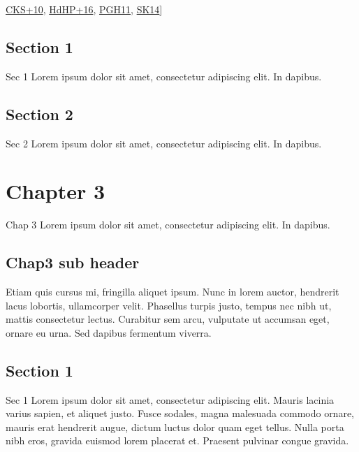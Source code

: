\sphinxAtStartPar


\sphinxAtStartPar{[}\hyperlink{cite.part1/chap2:id5}{CKS+10}, \hyperlink{cite.part1/chap2:id3}{HdHP+16}, \hyperlink{cite.part1/chap2:id2}{PGH11}, \hyperlink{cite.part1/chap2:id4}{SK14}{]}

\sphinxstepscope


\subsection{Section 1}
\label{\detokenize{part1/sec1:section-1}}\label{\detokenize{part1/sec1::doc}}
\sphinxAtStartPar
Sec 1 Lorem ipsum dolor sit amet, consectetur adipiscing elit. In dapibus.

\sphinxstepscope


\subsection{Section 2}
\label{\detokenize{part1/sec2:section-2}}\label{\detokenize{part1/sec2::doc}}
\sphinxAtStartPar
Sec 2 Lorem ipsum dolor sit amet, consectetur adipiscing elit. In dapibus.

\sphinxstepscope


\section{Chapter 3}
\label{\detokenize{part2/chap3:chapter-3}}\label{\detokenize{part2/chap3::doc}}
\sphinxAtStartPar
Chap 3 Lorem ipsum dolor sit amet, consectetur adipiscing elit. In dapibus.


\subsection{Chap3 sub header}
\label{\detokenize{part2/chap3:chap3-sub-header}}
\sphinxAtStartPar
Etiam quis cursus mi, fringilla aliquet ipsum. Nunc in lorem auctor, hendrerit lacus lobortis, ullamcorper velit. Phasellus turpis justo, tempus nec nibh ut, mattis consectetur lectus. Curabitur sem arcu, vulputate ut accumsan eget, ornare eu urna. Sed dapibus fermentum viverra.

\sphinxstepscope


\subsection{Section 1}
\label{\detokenize{part2/sec1:section-1}}\label{\detokenize{part2/sec1::doc}}
\sphinxAtStartPar
Sec 1 Lorem ipsum dolor sit amet, consectetur adipiscing elit. Mauris lacinia varius sapien, et aliquet justo. Fusce sodales, magna malesuada commodo ornare, mauris erat hendrerit augue, dictum luctus dolor quam eget tellus. Nulla porta nibh eros, gravida euismod lorem placerat et. Praesent pulvinar congue gravida.


